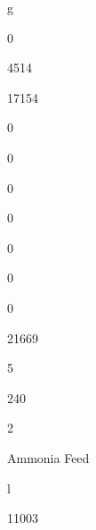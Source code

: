 \documentclass[a4paper,portrait,12pt]{article}
\begin{document}
\begin{flushleft}
g
\end{flushleft}





0





4514





17154





0





0





0





0





0





0





0





21669





5





240





2





\begin{flushleft}
Ammonia Feed
\end{flushleft}





\begin{flushleft}
l
\end{flushleft}





11003
\end{document}
